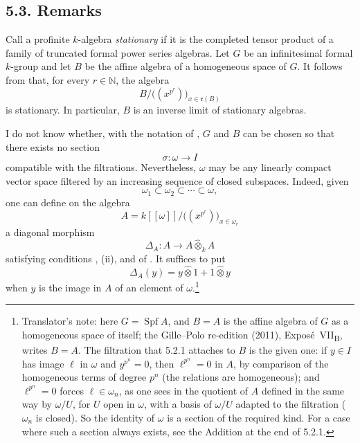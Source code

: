 
\subsection*{5.3. Remarks}
\label{sga3:VIIB:5.3}

Call a profinite \(k\)-algebra \emph{stationary} if it is the
completed tensor product of a family of truncated formal power
series algebras. Let \(G\) be an infinitesimal formal \(k\)-group and let \(B\)
be the affine algebra of a homogeneous space of \(G\). It follows
from  that, for every \(r\in\mathbb N\), the algebra
\[
  B
  \big/
  \bigl((x^{p^r})\bigr)_{x\in\mathfrak r(B)}
\]
is stationary. In particular, \(B\) is an inverse limit of
stationary algebras.

I do not know whether, with the notation of , \(G\) and
\(B\) can be chosen so that there exists no section
\[
  \sigma:\omega\longrightarrow I
\]
compatible with the filtrations.
Nevertheless, \(\omega\) may be any linearly compact vector space
filtered by an increasing sequence of closed subspaces. Indeed,
given
\[
  \omega_1\subset\omega_2\subset\cdots\subset\omega,
\]
one can define on the algebra
\[
  A
  =
  k[[\omega]]
  \big/
  \bigl((x^{p^r})\bigr)_{x\in\omega_r}
\]
a diagonal morphism
\[
  \Delta_A:A\longrightarrow A\widehat\otimes_kA
\]
satisfying conditions \textup{}, \textup{(ii)}, and
\textup{} of . It suffices to put
\[
  \Delta_A(y)
  =
  y\widehat\otimes1+1\widehat\otimes y
\]
when \(y\) is the image in \(A\) of an element of \(\omega\).\footnote{Translator's note: here
\(G=\operatorname{Spf}A\), and \(B=A\) is the affine algebra of \(G\) as a homogeneous space of itself;
the Gille--Polo re-edition (2011), Expos\'e~VII\textsubscript{B}, writes \(B=A\). The filtration that 5.2.1
attaches to \(B\) is the given one: if \(y\in I\) has image \(\ell\) in \(\omega\) and \(y^{p^n}=0\), then
\(\ell^{p^n}=0\) in \(A\), by comparison of the homogeneous terms of degree \(p^n\) (the relations are
homogeneous); and \(\ell^{p^n}=0\) forces \(\ell\in\omega_n\), as one sees in the quotient of \(A\) defined
in the same way by \(\omega/U\), for \(U\) open in \(\omega\), with a basis of \(\omega/U\) adapted to the
filtration (\(\omega_n\) is closed). So the identity of \(\omega\) is a section of the required kind. For a
case where such a section always exists, see the Addition at the end of 5.2.1.}

